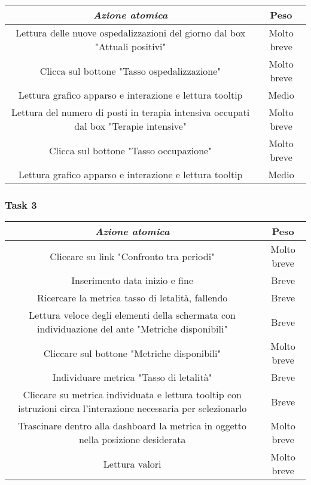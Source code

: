 {
\renewcommand{\arraystretch}{2}
\begin{longtable}[h]{| c | c |}
    \hline
    \textit{Azione atomica} & \textbf{Peso} \\
    \hline
    \endhead
    Lettura delle nuove ospedalizzazioni del giorno dal box "Attuali positivi" & Molto breve \\
    \hline
    Clicca sul bottone "Tasso ospedalizzazione" & Molto breve  \\
    \hline
    Lettura grafico apparso e interazione e lettura tooltip & Medio \\
    \hline
    Lettura del numero di posti in terapia intensiva occupati dal box "Terapie intensive" & Molto breve \\
    \hline
    Clicca sul bottone "Tasso occupazione" & Molto breve \\
    \hline
    Lettura grafico apparso e interazione e lettura tooltip & Medio \\
    \hline
\end{longtable}
}


\subsubsection{Task 3}
\label{sss:iaa-task-3}

{
\renewcommand{\arraystretch}{2}
\begin{longtable}[h]{| c | c |}
    \hline
    \textit{Azione atomica} & \textbf{Peso} \\
    \hline
    \endhead
    Cliccare su link "Confronto tra periodi" & Molto breve \\
    \hline
    Inserimento data inizio e fine & Breve  \\
    \hline
    Ricercare la metrica tasso di letalità, fallendo & Breve \\
    \hline
    Lettura veloce degli elementi della schermata con individuazione del ante "Metriche disponibili" & Breve \\
    \hline
    Cliccare sul bottone "Metriche disponibili" & Molto breve \\
    \hline
    Individuare metrica "Tasso di letalità"  & Breve \\
    \hline
    Cliccare su metrica individuata e lettura tooltip con istruzioni circa l'interazione necessaria per selezionarlo & Breve \\
    \hline
    Trascinare dentro alla dashboard la metrica in oggetto nella posizione desiderata & Molto breve \\
    \hline
    Lettura valori & Molto breve \\
    \hline
\end{longtable}
}


